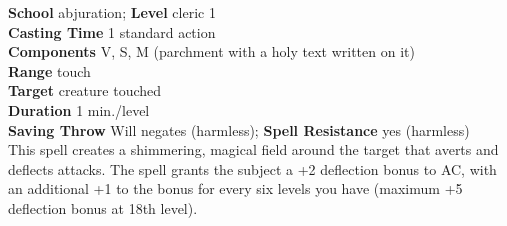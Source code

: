\textbf{School} abjuration; \textbf{Level} cleric 1\\
\textbf{Casting Time} 1 standard action\\
\textbf{Components} V, S, M (parchment with a holy text written on it)\\
\textbf{Range} touch\\
\textbf{Target} creature touched\\
\textbf{Duration} 1 min./level\\
\textbf{Saving Throw }Will negates (harmless); \textbf{Spell Resistance} yes (harmless)\\
This spell creates a shimmering, magical field around the target that averts and deflects attacks. The spell grants the subject a +2 deflection bonus to AC, with an additional +1 to the bonus for every six levels you have (maximum +5 deflection bonus at 18th level).\\
